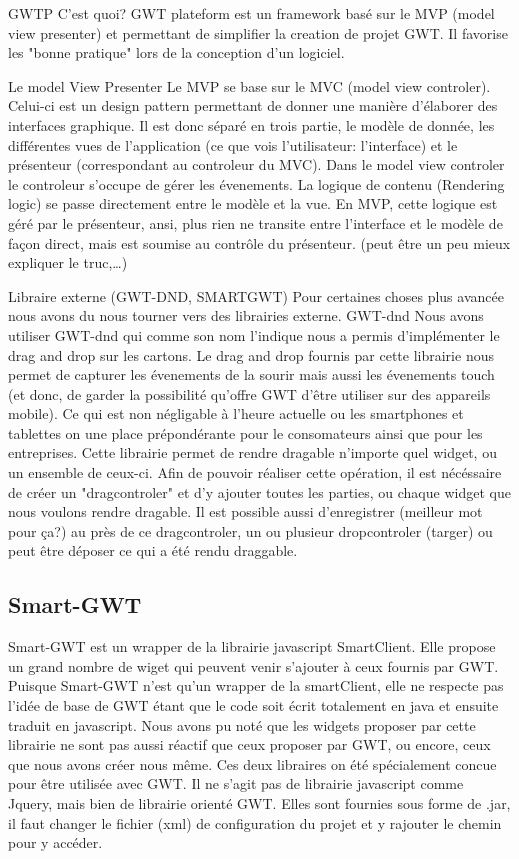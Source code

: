 GWTP
C'est quoi?
GWT plateform est un framework basé sur le MVP (model view presenter) et permettant de simplifier la creation de projet GWT. Il favorise les "bonne pratique" lors de la conception d'un logiciel.
	
	Le model View Presenter
Le MVP se base sur le MVC (model view controler). Celui-ci est un design pattern permettant de donner une manière d'élaborer des interfaces graphique. Il est donc séparé en trois partie, le modèle de donnée, les différentes vues de l'application (ce que vois l'utilisateur: l'interface) et le présenteur (correspondant au controleur du MVC). Dans le model view controler le controleur s'occupe de gérer les évenements. La logique de contenu (Rendering logic) se passe directement entre le modèle et la vue. En MVP, cette logique est géré par le présenteur, ansi, plus rien ne transite entre l'interface et le modèle de façon direct, mais est soumise au contrôle du présenteur. (peut être un peu mieux expliquer le truc,…)

Libraire externe (GWT-DND, SMARTGWT)
Pour certaines choses plus avancée nous avons du nous tourner vers des librairies externe. 
GWT-dnd
Nous avons utiliser GWT-dnd qui comme son nom l'indique nous a permis
d'implémenter le drag and drop sur les cartons. Le drag and drop fournis par
cette librairie nous permet de capturer les évenements de la sourir mais aussi les évenements touch (et donc, de garder la possibilité qu'offre GWT d'être utiliser sur des appareils mobile). Ce qui est non négligable à l'heure actuelle ou les smartphones et tablettes on une place prépondérante pour le consomateurs ainsi que pour les entreprises. Cette librairie permet de rendre dragable n'importe quel widget, ou un ensemble de ceux-ci. Afin de pouvoir réaliser cette opération, il est nécéssaire de créer un "dragcontroler" et d'y ajouter toutes les parties, ou chaque widget que nous voulons rendre dragable. Il est possible aussi d'enregistrer (meilleur mot pour ça?) au près de ce dragcontroler, un ou plusieur dropcontroler (targer) ou peut être déposer ce qui a été rendu draggable.

\subsection{Smart-GWT}
Smart-GWT est un wrapper de la librairie javascript SmartClient. Elle propose un grand nombre de wiget qui peuvent venir s'ajouter à ceux fournis par GWT. Puisque Smart-GWT n'est qu'un wrapper de la smartClient, elle ne respecte pas l'idée de base de GWT étant que le code soit écrit totalement en java et ensuite traduit en javascript. Nous avons pu noté que les widgets proposer par cette librairie ne sont pas aussi réactif que ceux proposer par GWT, ou encore, ceux que nous avons créer nous même.
Ces deux libraires on été spécialement concue pour être utilisée avec GWT. Il ne s'agit pas de librairie javascript comme Jquery, mais bien de librairie orienté GWT. Elles sont fournies sous forme de .jar, il faut changer le fichier (xml) de configuration du projet et y rajouter le chemin pour y accéder.


